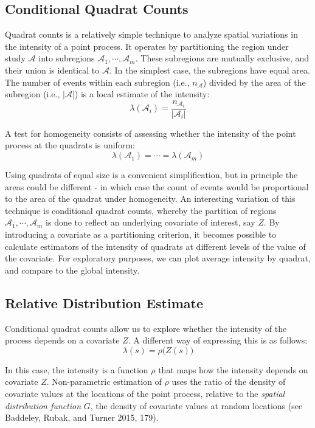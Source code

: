 \documentclass[smallextended]{svjour3}       %
\begin{document}
\hypertarget{conditional-quadrat-counts}{%
\subsection{Conditional Quadrat
Counts}\label{conditional-quadrat-counts}}

Quadrat counts is a relatively simple technique to analyze spatial
variations in the intensity of a point process. It operates by
partitioning the region under study \(\mathcal{A}\) into subregions
\(\mathcal{A}_1,\cdots,\mathcal{A}_m\). These subregions are mutually
exclusive, and their union is identical to \(\mathcal{A}\). In the
simplest case, the subregions have equal area. The number of events
within each subregion (i.e., \(n_{\mathcal{A}}\)) divided by the area of
the subregion (i.e., \(|\mathcal{A}|\)) is a local estimate of the
intensity: \[
\lambda(\mathcal{A}_i)=\frac{n_{\mathcal{A}_i}}{|\mathcal{A}_i|}
\]

A test for homogeneity consists of assessing whether the intensity of
the point process at the quadrats is uniform: \[
\lambda(\mathcal{A}_1)=\cdots=\lambda(\mathcal{A}_m)
\]

Using quadrats of equal size is a convenient simplification, but in
principle the areas could be different - in which case the count of
events would be proportional to the area of the quadrat under
homogeneity. An interesting variation of this technique is conditional
quadrat counts, whereby the partition of regions
\(\mathcal{A}_1,\cdots,\mathcal{A}_m\) is done to reflect an underlying
covariate of interest, say \(Z\). By introducing a covariate as a
partitioning criterion, it becomes possible to calculate estimators of
the intensity of quadrats at different levels of the value of the
covariate. For exploratory purposes, we can plot average intensity by
quadrat, and compare to the global intensity.

\hypertarget{relative-distribution-estimate}{%
\subsection{Relative Distribution
Estimate}\label{relative-distribution-estimate}}

Conditional quadrat counts allow us to explore whether the intensity of
the process depends on a covariate \(Z\). A different way of expressing
this is as follows: \[
\lambda(s)=\rho\big(Z(s)\big)
\]

In this case, the intensity is a function \(\rho\) that maps how the
intensity depends on covariate \(Z\). Non-parametric estimation of
\(\rho\) uses the ratio of the density of covariate values at the
locations of the point process, relative to the \emph{spatial
distribution function} \(G\), the density of covariate values at random
locations (see Baddeley, Rubak, and Turner 2015, 179).
\end{document}
